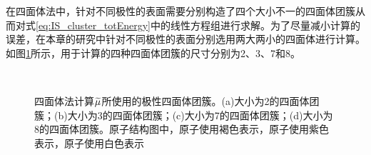 在四面体法中，针对不同极性的表面需要分别构造了四个大小不一的四面体团簇从而对式\eqref{eq:IS_cluster_totEnergy}中的线性方程组进行求解。为了尽量减小计算的误差，在本章的研究中针对不同极性的表面分别选用两大两小的四面体进行计算。如图\ref{fig:IS_structure_cluster}所示，用于计算的四种四面体团簇的尺寸分别为2、3、7和8。

\begin{figure}[htb]
    \\
    \caption{四面体法计算$\it \widetilde{\mu}_{\rm }^{\rm } \it$所使用的极性四面体团簇。(a)大小为2的四面体团簇；(b)大小为3的四面体团簇；(c)大小为7的四面体团簇；(d)大小为8的四面体团簇。原子结构图中，原子使用褐色表示，原子使用紫色表示，原子使用白色表示}
    \label{fig:IS_structure_cluster}
\end{figure}

